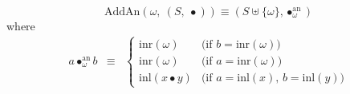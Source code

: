 \[ 
  \mathrm{AddAn}(\omega,\ (S,\ \bullet)) \equiv (S \uplus \{\omega\}, \bullet_{\omega}^{\mathrm{an}})
\] 
where 
\[
\begin{array}{rcl} 
a \bullet_{\omega}^{\mathrm{an}} b 
& \equiv & 
\left\{\begin{array}{cl} 
      \mathrm{inr}(\omega) & \mbox{(if $b = \mathrm{inr}(\omega)$)} \\ 
      \mathrm{inr}(\omega) & \mbox{(if $a = \mathrm{inr}(\omega)$)} \\ 
      \mathrm{inl}(x\bullet y) & \mbox{(if $a = \mathrm{inl}(x)$, $b = \mathrm{inl}(y)$)} 
      \end{array} 
\right.
\end{array} 
\] 
